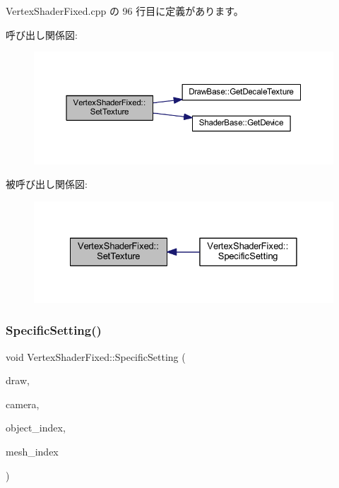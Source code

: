  Vertex\+Shader\+Fixed.\+cpp の 96 行目に定義があります。

呼び出し関係図\+:\nopagebreak
\begin{figure}[H]
\begin{center}
\leavevmode
\includegraphics[width=350pt]{class_vertex_shader_fixed_a1caad0cf4c86788ed17c2a8da8645414_cgraph}
\end{center}
\end{figure}
被呼び出し関係図\+:\nopagebreak
\begin{figure}[H]
\begin{center}
\leavevmode
\includegraphics[width=328pt]{class_vertex_shader_fixed_a1caad0cf4c86788ed17c2a8da8645414_icgraph}
\end{center}
\end{figure}
\mbox{\label{class_vertex_shader_fixed_a87523c320f6f6767d59d7b24265db7ec}} 
\subsubsection{\texorpdfstring{Specific\+Setting()}{SpecificSetting()}}
{\footnotesize\ttfamily void Vertex\+Shader\+Fixed\+::\+Specific\+Setting (\begin{DoxyParamCaption}\item[{\mbox{\hyperlink{class_draw_base}{Draw\+Base}} $\ast$}]{draw,  }\item[{\mbox{\hyperlink{class_camera}{Camera}} $\ast$}]{camera,  }\item[{unsigned}]{object\+\_\+index,  }\item[{unsigned}]{mesh\+\_\+index }\end{DoxyParamCaption})\hspace{0.3cm}{\ttfamily [virtual]}}



